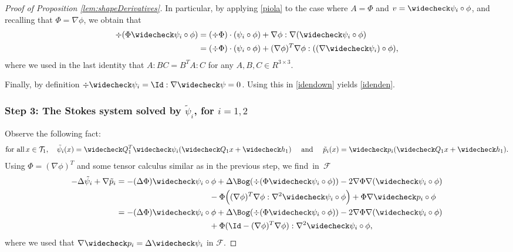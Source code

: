 \begin{proof}[Proof of Proposition \ref{lem:shapeDerivatives}]
In particular, by applying \eqref{piola} to the case where $A= \Phi$ and $v= \widecheck \psi_i \circ \phi$, and recalling that $\Phi = \nabla \phi$, we obtain that
\begin{equation}
\begin{aligned}
\div (\Phi \widecheck \psi_i \circ \phi) &=
(\div \Phi) \cdot (\psi_i \circ \phi) +
\nabla \phi : \nabla (\widecheck \psi_i \circ \phi) \\
&= (\div \Phi) \cdot (\psi_i \circ \phi) +
(\nabla \phi)^T \nabla \phi : ((\nabla \widecheck \psi_i) \circ \phi), \label{idendown}
\end{aligned}
\end{equation}
where we used in the last identity that $A:BC = B^T A : C$ for any $A,B,C \in R^{3 \times 3}$.

Finally, by definition $\div \widecheck \psi_i = \Id : \nabla \widecheck \psi = 0$. Using this in \eqref{idendown} yields \eqref{idenden}.

\subsubsection*{Step 3: The Stokes system solved by $\tilde \psi_i$, for $i=1,2$}
Observe the following fact:
\begin{equation} \label{soliv-tout}
\text{for all} \, x \in \mathcal T_1, \quad
\tilde \psi_i (x) = \widecheck Q_1^T \widecheck \psi_i (\widecheck Q_1 x + \widecheck h_1)
\quad \text{ and } \quad
\tilde p_i(x) = \widecheck p_i (\widecheck Q_1 x + \widecheck h_1).
\end{equation}
Using $\Phi \!=\! (\nabla \phi)^T$ and some tensor calculus similar as in the previous step, we find~in~$\mathcal F$
\begin{align*}
- \Delta \tilde \psi_i + \nabla \tilde p_i &= - (\Delta \Phi) \widecheck \psi_i \circ \phi + \Delta \Bog (\div (\Phi \widecheck \psi_i \circ \phi))
- 2 \nabla \Phi \nabla (\widecheck \psi_i \circ \phi) \\
& \hspace*{4cm}-\Phi \Big((\nabla \phi)^T \nabla \phi : \nabla^2 \widecheck \psi_i \circ \phi \Big) + \Phi \nabla \widecheck p_i \circ \phi \\
& = -(\Delta \Phi) \widecheck \psi_i \circ \phi + \Delta \Bog (\div (\Phi \widecheck \psi_i \circ \phi)) - 2 \nabla \Phi \nabla (\widecheck \psi_i \circ \phi) \\
&\hspace*{4cm}+ \Phi (\Id - (\nabla \phi)^T\nabla \phi) : \nabla^2 \widecheck \psi_i \circ \phi,
\end{align*}
where we used that $ \nabla \widecheck p_i = \Delta \widecheck \psi_i$ in $\mathcal F$.


\end{proof}

